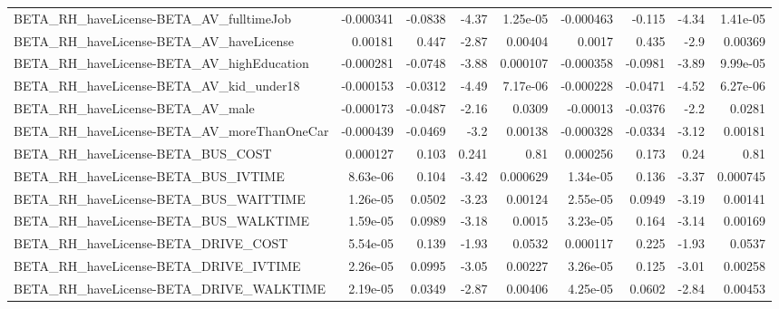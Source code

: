 \begin{tabular}{lrrrrrrrr}
BETA\_RH\_haveLicense-BETA\_AV\_fulltimeJob            &   -0.000341 &      -0.0838 &     -4.37 & 1.25e-05 &  -0.000463 &      -0.115 &        -4.34 &      1.41e-05 \\
BETA\_RH\_haveLicense-BETA\_AV\_haveLicense            &     0.00181 &        0.447 &     -2.87 &  0.00404 &     0.0017 &       0.435 &         -2.9 &       0.00369 \\
BETA\_RH\_haveLicense-BETA\_AV\_highEducation          &   -0.000281 &      -0.0748 &     -3.88 & 0.000107 &  -0.000358 &     -0.0981 &        -3.89 &      9.99e-05 \\
BETA\_RH\_haveLicense-BETA\_AV\_kid\_under18            &   -0.000153 &      -0.0312 &     -4.49 & 7.17e-06 &  -0.000228 &     -0.0471 &        -4.52 &      6.27e-06 \\
BETA\_RH\_haveLicense-BETA\_AV\_male                   &   -0.000173 &      -0.0487 &     -2.16 &   0.0309 &   -0.00013 &     -0.0376 &         -2.2 &        0.0281 \\
BETA\_RH\_haveLicense-BETA\_AV\_moreThanOneCar         &   -0.000439 &      -0.0469 &      -3.2 &  0.00138 &  -0.000328 &     -0.0334 &        -3.12 &       0.00181 \\
BETA\_RH\_haveLicense-BETA\_BUS\_COST                  &    0.000127 &        0.103 &     0.241 &     0.81 &   0.000256 &       0.173 &         0.24 &          0.81 \\
BETA\_RH\_haveLicense-BETA\_BUS\_IVTIME                &    8.63e-06 &        0.104 &     -3.42 & 0.000629 &   1.34e-05 &       0.136 &        -3.37 &      0.000745 \\
BETA\_RH\_haveLicense-BETA\_BUS\_WAITTIME              &    1.26e-05 &       0.0502 &     -3.23 &  0.00124 &   2.55e-05 &      0.0949 &        -3.19 &       0.00141 \\
BETA\_RH\_haveLicense-BETA\_BUS\_WALKTIME              &    1.59e-05 &       0.0989 &     -3.18 &   0.0015 &   3.23e-05 &       0.164 &        -3.14 &       0.00169 \\
BETA\_RH\_haveLicense-BETA\_DRIVE\_COST                &    5.54e-05 &        0.139 &     -1.93 &   0.0532 &   0.000117 &       0.225 &        -1.93 &        0.0537 \\
BETA\_RH\_haveLicense-BETA\_DRIVE\_IVTIME              &    2.26e-05 &       0.0995 &     -3.05 &  0.00227 &   3.26e-05 &       0.125 &        -3.01 &       0.00258 \\
BETA\_RH\_haveLicense-BETA\_DRIVE\_WALKTIME            &    2.19e-05 &       0.0349 &     -2.87 &  0.00406 &   4.25e-05 &      0.0602 &        -2.84 &       0.00453 \\

\end{tabular}
